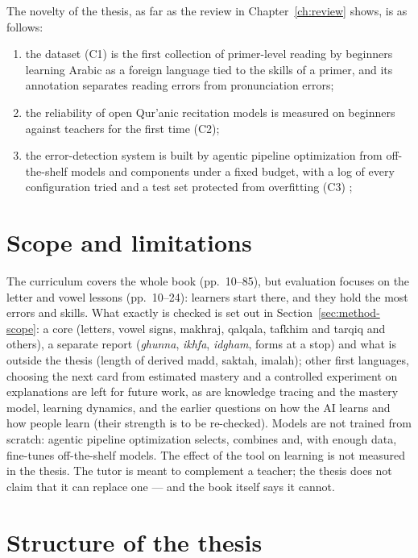 The novelty of the thesis, as far as the review in Chapter~\ref{ch:review} shows, is as follows:
\begin{enumerate}
  \item the dataset (C1) is the first collection of primer-level reading by beginners learning Arabic as a
    foreign language tied to the skills of a primer, and its annotation separates reading errors from
    pronunciation errors;
  \item the reliability of open Qur'anic recitation models is measured on beginners against teachers for the
    first time (C2);
  \item the error-detection system is built by agentic pipeline optimization from off-the-shelf models and
    components under a fixed budget, with a log of every configuration tried and a test set protected from overfitting (C3)
    ;
\end{enumerate}

\section{Scope and limitations}

The curriculum covers the whole book (pp.~10--85), but evaluation focuses on the letter and vowel lessons
(pp.~10--24): learners start there, and they hold the most errors and skills. What exactly is checked is set out in Section~\ref{sec:method-scope}: a core (letters, vowel signs, makhraj, qalqala, tafkhim and tarqiq and others), a separate report (\emph{ghunna}, \emph{ikhfa}, \emph{idgham}, forms at a stop) and what is outside the thesis (length of derived madd, saktah, imalah); other first languages, choosing the next card from estimated mastery and a
controlled experiment on explanations are left for future work, as are knowledge tracing and the mastery model, learning dynamics, and the earlier questions on how the AI
learns and how people learn (their strength is to be re-checked). Models are not trained
from scratch: agentic pipeline optimization selects, combines and, with enough data, fine-tunes off-the-shelf models.
The effect of the tool on learning is not measured in the thesis. The
tutor is meant to complement a teacher; the thesis does not claim that it can replace one --- and the book itself
says it cannot.

\section{Structure of the thesis}

